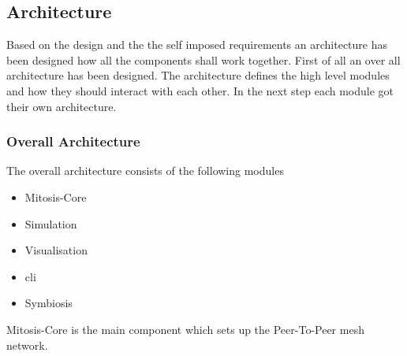 \subsection{Architecture}
Based on the design and the the self imposed requirements an architecture has been designed how all the components shall work together.
First of all an over all architecture has been designed. The architecture defines the high level modules and how they should interact with each other. 
In the next step each module got their own architecture.

\subsubsection{Overall Architecture}
The overall architecture consists of the following modules
\begin{itemize}
    \item Mitosis-Core
    \item Simulation
    \item Visualisation
    \item \gls{cli}
    \item Symbiosis
\end{itemize}

Mitosis-Core is the main component which sets up the Peer-To-Peer mesh network. 
